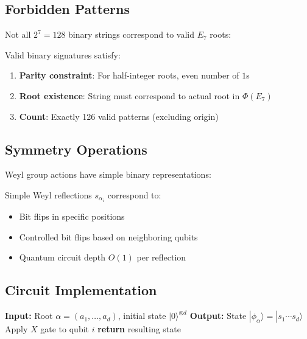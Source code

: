 \subsection{Forbidden Patterns}

Not all $2^7 = 128$ binary strings correspond to valid $E_7$ roots:

\begin{proposition}
\label{prop:e7_binary_constraints}
Valid binary signatures satisfy:
\begin{enumerate}
    \item \textbf{Parity constraint}: For half-integer roots, even number of $1$s
    \item \textbf{Root existence}: String must correspond to actual root in $\Phi(E_7)$
    \item \textbf{Count}: Exactly 126 valid patterns (excluding origin)
\end{enumerate}
\end{proposition}

\subsection{Symmetry Operations}

Weyl group actions have simple binary representations:

\begin{theorem}
\label{thm:weyl_bitflip}
Simple Weyl reflections $s_{\alpha_i}$ correspond to:
\begin{itemize}
    \item Bit flips in specific positions
    \item Controlled bit flips based on neighboring qubits
    \item Quantum circuit depth $O(1)$ per reflection
\end{itemize}
\end{theorem}

\subsection{Circuit Implementation}

\begin{algorithm}[H]
\caption{Prepare Binary Signature State}
\label{alg:binary_signature_prep}
\begin{algorithmic}[1]
\State \textbf{Input:} Root $\alpha = (a_1, \ldots, a_d)$, initial state $|0\rangle^{\otimes d}$
\State \textbf{Output:} State $|\phi_\alpha\rangle = |s_1 \cdots s_d\rangle$
\State
{}
        \State Apply $X$ gate to qubit $i$
    \EndIf
\EndFor
\State \textbf{return} resulting state
\end{algorithmic}
\end{algorithm}

